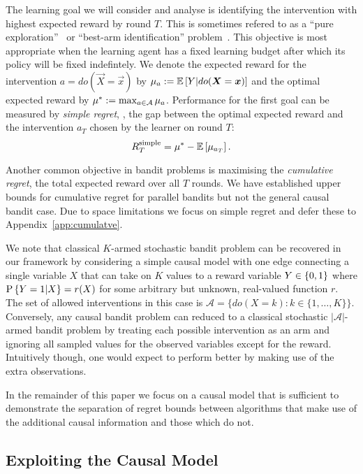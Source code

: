 The learning goal we will consider and analyse is identifying the intervention with highest expected reward by round $T$.
This is sometimes refered to as a ``pure exploration''~\citep{Bubeck2009} or ``best-arm identification'' problem~\citep{Gabillon2012}.
This objective is most appropriate when the learning agent has a fixed learning budget after which its policy will be fixed indefintely. 
We denote the expected reward for the intervention $a = do(\vec{X} = \vec{x})$ by $\mu_{a} := \E{Y | do(\vec{X} = \vec{x})}$ and the optimal expected reward by $\mu^* := \max_{a\in\actions} \mu_{a}$.
Performance for the first goal can be measured by \emph{simple regret}, \ie, the gap between the optimal expected reward and the intervention $a_T$ chosen by the learner on round $T$:
\begin{equation}
\label{eq:regret-simple}
	\simpleregret = \mu^* - \E{\mu_{a_T}}.
\end{equation}

Another common objective in bandit problems is maximising the \emph{cumulative regret}, the total expected reward over all $T$ rounds. 
We have established upper bounds for cumulative regret for parallel bandits but not the general causal bandit case.
Due to space limitations we focus on simple regret and defer these to Appendix~\ref{app:cumulatve}.

We note that classical $K$-armed stochastic bandit problem can be recovered in our framework by considering a simple causal model with one edge connecting a single variable $X$ that can take on $K$ values to a reward variable $Y \in \set{0,1}$ where $\P{Y = 1|X} = r(X)$ for some arbitrary but unknown, real-valued function $r$.
The set of allowed interventions in this case is $\mathcal{A} = \{ do(X = k) \colon k \in \{1, \ldots, K\}\}$.
Conversely, any causal bandit problem can reduced to a classical stochastic $|\mathcal{A}|$-armed bandit problem by treating each possible intervention as an arm and ignoring all sampled values for the observed variables except for the reward.
Intuitively though, one would expect to perform better by making use of the extra observations.

In the remainder of this paper we focus on a causal model that is sufficient to demonstrate the separation of regret bounds between algorithms that make use of the additional causal information and those which do not.




\subsection{Exploiting the Causal Model}

